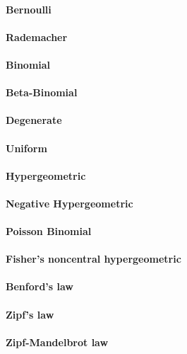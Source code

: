 \paragraph{Bernoulli}
\paragraph{Rademacher}
\paragraph{Binomial}
\paragraph{Beta-Binomial}
\paragraph{Degenerate}
\paragraph{Uniform}
\paragraph{Hypergeometric}
\paragraph{Negative Hypergeometric}
\paragraph{Poisson Binomial}
\paragraph{Fisher's noncentral hypergeometric}
\paragraph{Benford's law}
\paragraph{Zipf's law}
\paragraph{Zipf-Mandelbrot law}

